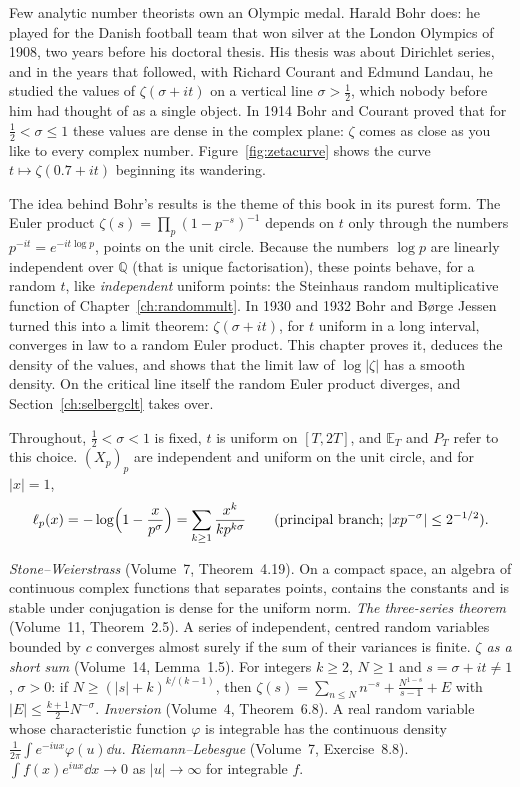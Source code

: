Few analytic number theorists own an Olympic medal. Harald Bohr does: he played for the Danish football team that won silver at the London Olympics of 1908, two years before his doctoral thesis. His thesis was about Dirichlet series, and in the years that followed, with Richard Courant and Edmund Landau, he studied the values of $\zeta(\sigma+it)$ on a vertical line $\sigma>\frac12$, which nobody before him had thought of as a single object. In 1914 Bohr and Courant proved that for $\frac12<\sigma\le1$ these values are dense in the complex plane: $\zeta$ comes as close as you like to every complex number. Figure~\ref{fig:zetacurve} shows the curve $t\mapsto\zeta(0.7+it)$ beginning its wandering.

The idea behind Bohr's results is the theme of this book in its purest form. The Euler product $\zeta(s)=\prod_p(1-p^{-s})^{-1}$ depends on $t$ only through the numbers $p^{-it}=e^{-it\log p}$, points on the unit circle. Because the numbers $\log p$ are linearly independent over $\mathbb Q$ (that is unique factorisation), these points behave, for a random $t$, like \emph{independent} uniform points: the Steinhaus random multiplicative function of Chapter~\ref{ch:randommult}. In 1930 and 1932 Bohr and Børge Jessen turned this into a limit theorem: $\zeta(\sigma+it)$, for $t$ uniform in a long interval, converges in law to a random Euler product. This chapter proves it, deduces the density of the values, and shows that the limit law of $\log|\zeta|$ has a smooth density. On the critical line itself the random Euler product diverges, and Section~\ref{ch:selbergclt} takes over.

Throughout, $\frac12<\sigma<1$ is fixed, $t$ is uniform on $[T,2T]$, and $\mathbb E_T$ and $P_T$ refer to this choice. $(X_p)_p$ are independent and uniform on the unit circle, and for $|x|=1$,
\[
\ell_p(x)=-\log\Bigl(1-\frac x{p^\sigma}\Bigr)=\sum_{k\ge1}\frac{x^k}{kp^{k\sigma}}\qquad(\text{principal branch; }|xp^{-\sigma}|\le2^{-1/2}).
\]

\begin{reminder}
\emph{Stone--Weierstrass} (Volume~7, Theorem~4.19). On a compact space, an algebra of continuous complex functions that separates points, contains the constants and is stable under conjugation is dense for the uniform norm.
\emph{The three-series theorem} (Volume~11, Theorem~2.5). A series of independent, centred random variables bounded by $c$ converges almost surely if the sum of their variances is finite.
\emph{$\zeta$ as a short sum} (Volume~14, Lemma~1.5). For integers $k\ge2$, $N\ge1$ and $s=\sigma+it\ne1$, $\sigma>0$: if $N\ge(|s|+k)^{k/(k-1)}$, then $\zeta(s)=\sum_{n\le N}n^{-s}+\frac{N^{1-s}}{s-1}+E$ with $|E|\le\frac{k+1}2N^{-\sigma}$.
\emph{Inversion} (Volume~4, Theorem~6.8). A real random variable whose characteristic function $\varphi$ is integrable has the continuous density $\frac1{2\pi}\int e^{-iux}\varphi(u)\dd u$.
\emph{Riemann--Lebesgue} (Volume~7, Exercise~8.8). $\int f(x)e^{iux}\dd x\to0$ as $|u|\to\infty$ for integrable $f$.
\end{reminder}

